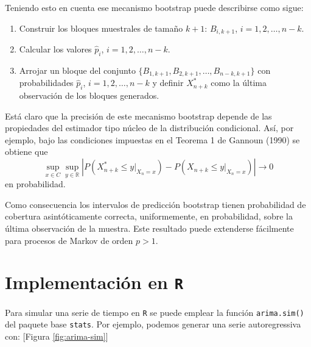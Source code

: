 \documentclass[]{book}
\theoremstyle{break}
\theoremstyle{definition}
\theoremstyle{definition}
\theoremstyle{definition}
\theoremstyle{remark}
\begin{document}
Teniendo esto en cuenta ese mecanismo bootstrap puede describirse como
sigue:

\begin{enumerate}
\def\labelenumi{\arabic{enumi}.}
\item
  Construir los bloques muestrales de tamaño \(k+1\): \(B_{i,k+1}\),
  \(i=1,2,\ldots ,n-k\).
\item
  Calcular los valores \(\widehat{p}_i\), \(i=1,2,\ldots ,n-k\).
\item
  Arrojar un bloque del conjunto
  \(\{B_{1,k+1},B_{2,k+1},\ldots ,B_{n-k,k+1}\}\) con probabilidades
  \(\widehat{p}_i\), \(i=1,2,\ldots ,n-k\) y definir \(X_{n+k}^{\ast}\)
  como la última observación de los bloques generados.
\end{enumerate}

Está claro que la precisión de este mecanismo bootstrap depende de las
propiedades del estimador tipo núcleo de la distribución condicional.
Así, por ejemplo, bajo las condiciones impuestas en el Teorema 1 de
Gannoun (1990) se obtiene que
\[\sup_{x\in C}\sup_{y\in \mathbb{R}}\left\vert P\left( X_{n+k}^{\ast}\leq
y|_{X_n=x} \right) -P\left( X_{n+k}\leq y|_{X_n=x} \right) \right\vert
\rightarrow 0\] en probabilidad.

Como consecuencia los intervalos de predicción bootstrap tienen
probabilidad de cobertura asintóticamente correcta, uniformemente, en
probabilidad, sobre la última observación de la muestra. Este resultado
puede extenderse fácilmente para procesos de Markov de orden \(p>1\).

\section{\texorpdfstring{Implementación en
\texttt{R}}{Implementación en R}}\label{implementaciuxf3n-en-r}

Para simular una serie de tiempo en \texttt{R} se puede emplear la
función \texttt{arima.sim()} del paquete base \texttt{stats}. Por
ejemplo, podemos generar una serie autoregressiva con: {[}Figura
\ref{fig:arima-sim}{]}
\end{document}
